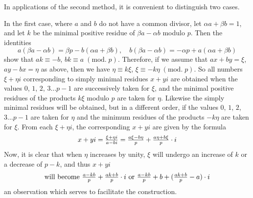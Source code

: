 \documentclass[twoside,12pt]{memoir}
\renewcommand{\pmod}[1]{\;(\textrm{mod.}\;#1)}
\let\oldfrac\frac
\def\frac#1#2{\mathchoice{\tfrac{#1}{#2}}{\oldfrac{#1}{#2}}{\genfrac{}{}{}{2}{#1}{#2\mathstrut}}{\genfrac{}{}{}{3}{#1}{#2\mathstrut}}}
\begin{document}
In applications of the second method, it is convenient to distinguish two cases.

In the first case, where \(a\) and \(b\) do not have a common divisor, let \(\alpha a+\beta b=1\), and let \(k\) be the minimal positive residue of \(\beta a-\alpha b\) modulo \(p\). Then the identities
\[a(\beta a-\alpha b)=\beta p-b(\alpha a+\beta b), \quad b(\beta a-\alpha b)=-\alpha p+a(\alpha a+\beta b)\]
show that \(a k \equiv-b\), \(b k \equiv a \pmod{p}\). Therefore, if we assume that \(a x+b y=\xi\), \(a y-b x=\eta\) as above, then we have \(\eta \equiv k \xi\), \(\xi \equiv -k \eta \pmod{p}\). So all numbers \(\xi+\eta i\) corresponding to simply minimal residues \(x+y i\) are obtained when the values \(0\), \(1\), \(2\), \(3 \ldots p-1\) are successively taken for \(\xi\), and the minimal positive residues of the products \(k \xi\) modulo \(p\) are taken for \(\eta\).  Likewise the simply minimal residues will be obtained, but in a different order, if the values \(0\), \(1\), \(2\), \(3 \ldots p-1\) are taken for \(\eta\) and the minimum residues of the products \(-k \eta\) are taken for \(\xi\). From each \(\xi+\eta i\), the corresponding \(x+y i\) are given by the formula
\[x+y i=\frac{\xi+\eta i}{a-b i}=\frac{a \xi-b \eta}{p}+\frac{a \eta+b \xi}{p} \cdot i\]
Now, it is clear that when \(\eta\) increases by unity, \(\xi\) will undergo an increase of \(k\) or a decrease of \(p-k\), and thus \(x+y i\)
\[ \text{will become } \frac{a-k b}{p}+\frac{a k+b}{p} \cdot i \text{ or } \frac{a-k b}{p}+b+(\frac{a k+b}{p}-a) \cdot i \]
an observation which serves to facilitate the construction.
%
\end{document}
